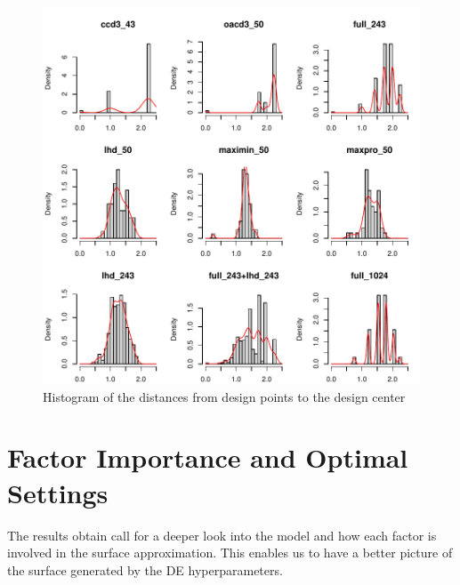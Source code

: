 \documentclass [PhD] {package/uclathes}
\begin{document}
\begin{figure}%
    \centering
    \includegraphics{chapters/DE/pdfs/histogram}
    \caption{Histogram of the distances from  design points to the design center}
    \label{fig:distance}
\end{figure}


\section{Factor Importance and Optimal Settings}
The results obtain call for a deeper look into the model and how each factor is involved in the surface approximation. This enables us to have a better picture of the surface generated by the DE hyperparameters.

\end{document}
